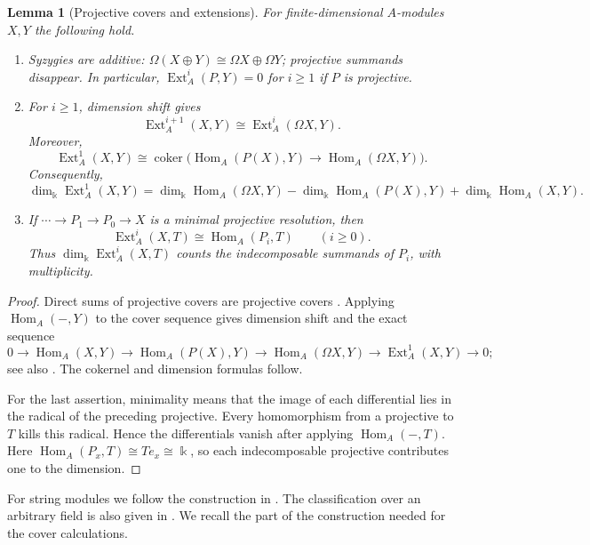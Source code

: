 \documentclass[reqno]{amsart}
\makeatletter
\def\section{\@startsection{section}{3}\z@{.8\linespacing\@plus.7\linespacing}{1\linespacing}{\normalfont\Large\bfseries \centering}}
\numberwithin{equation}{section}
\newtheorem{lemma}[theorem]{Lemma}
\theoremstyle{definition}
\theoremstyle{remark}
\DeclareMathOperator{\Hom}{Hom}
\DeclareMathOperator{\Ext}{Ext}
\newcommand{\Om}{\Omega}
\newcommand{\kk}{\Bbbk}
\newcommand{\kdim}{\dim_{\kk}}
\makeatother
\begin{document}
\begin{lemma}[Projective covers and extensions]\label{lem:homological}
For finite-dimensional \(A\)-modules \(X,Y\) the following hold.
\begin{enumerate}
\item Syzygies are additive: \(\Om(X\oplus Y)\cong\Om X\oplus\Om Y\); projective summands disappear. In particular, \(\Ext_A^i(P,Y)=0\) for \(i\ge1\) if \(P\) is projective.
\item For \(i\ge1\), dimension shift gives
\[
\Ext_A^{i+1}(X,Y)\cong\Ext_A^i(\Om X,Y).
\]
Moreover,
\begin{equation}\label{eq:cokernel}
\Ext_A^1(X,Y)\cong\operatorname{coker}\bigl(\Hom_A(P(X),Y)\longrightarrow\Hom_A(\Om X,Y)\bigr).
\end{equation}
Consequently,
\[
\kdim\Ext_A^1(X,Y)=\kdim\Hom_A(\Om X,Y)-\kdim\Hom_A(P(X),Y)+\kdim\Hom_A(X,Y).
\]
\item If \(\cdots\to P_1\to P_0\to X\) is a minimal projective resolution, then
\[
\Ext_A^i(X,T)\cong\Hom_A(P_i,T)\qquad(i\ge0).
\]
Thus \(\kdim\Ext_A^i(X,T)\) counts the indecomposable summands of \(P_i\), with multiplicity.
\end{enumerate}
\end{lemma}
\begin{proof}
Direct sums of projective covers are projective covers \cite[I, Proposition~4.3]{ARS}. Applying \(\Hom_A(-,Y)\) to the cover sequence gives dimension shift and the exact sequence
\[
0\longrightarrow\Hom_A(X,Y)\longrightarrow\Hom_A(P(X),Y)
\longrightarrow\Hom_A(\Om X,Y)\longrightarrow\Ext_A^1(X,Y)\longrightarrow0;
\]
see also \cite[I, \S5]{ARS}. The cokernel and dimension formulas follow.

For the last assertion, minimality means that the image of each differential lies in the radical of the preceding projective. Every homomorphism from a projective to \(T\) kills this radical. Hence the differentials vanish after applying \(\Hom_A(-,T)\). Here \(\Hom_A(P_x,T)\cong Te_x\cong\kk\), so each indecomposable projective contributes one to the dimension.
\end{proof}

For string modules we follow the construction in \cite[\S3]{ButlerRingel}. The classification over an arbitrary field is also given in \cite[Theorems~1.1--1.2]{CrawleyBoevey18}. We recall the part of the construction needed for the cover calculations.

\section{The syzygy matrix}\label{sec:matrix}
\end{document}
